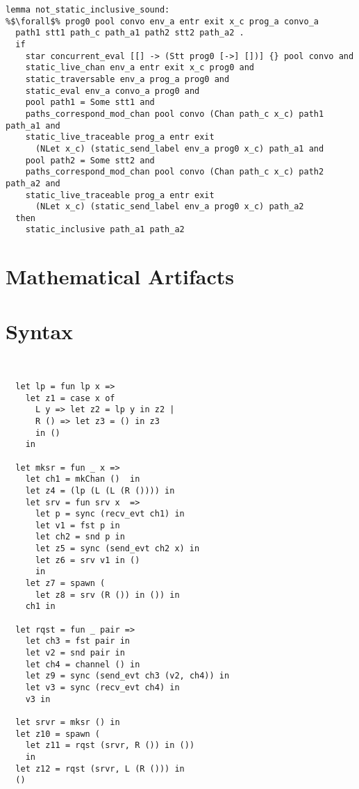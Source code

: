 \documentclass{article}
\begin{document}
\begin{lstlisting}[language=logic, style=codestyle1, escapechar=\%]
lemma not_static_inclusive_sound:
%$\forall$% prog0 pool convo env_a entr exit x_c prog_a convo_a
  path1 stt1 path_c path_a1 path2 stt2 path_a2 .
  if
    star concurrent_eval [[] -> (Stt prog0 [->] [])] {} pool convo and 
    static_live_chan env_a entr exit x_c prog0 and 
    static_traversable env_a prog_a prog0 and 
    static_eval env_a convo_a prog0 and 
    pool path1 = Some stt1 and 
    paths_correspond_mod_chan pool convo (Chan path_c x_c) path1 path_a1 and 
    static_live_traceable prog_a entr exit
      (NLet x_c) (static_send_label env_a prog0 x_c) path_a1 and 
    pool path2 = Some stt2 and 
    paths_correspond_mod_chan pool convo (Chan path_c x_c) path2 path_a2 and 
    static_live_traceable prog_a entr exit
      (NLet x_c) (static_send_label env_a prog0 x_c) path_a2
  then
    static_inclusive path_a1 path_a2

  \end{lstlisting}












\section{Mathematical Artifacts}


\section{Syntax}

\begin{lstlisting}[language=logic, style=codestyle1, escapechar=\%]


  let lp = fun lp x => 
    let z1 = case x of 
      L y => let z2 = lp y in z2 |
      R () => let z3 = () in z3
      in ()
    in

  let mksr = fun _ x => 
    let ch1 = mkChan ()  in
    let z4 = (lp (L (L (R ()))) in
    let srv = fun srv x  =>
      let p = sync (recv_evt ch1) in
      let v1 = fst p in
      let ch2 = snd p in 
      let z5 = sync (send_evt ch2 x) in
      let z6 = srv v1 in ()
      in
    let z7 = spawn (
      let z8 = srv (R ()) in ()) in
    ch1 in

  let rqst = fun _ pair =>
    let ch3 = fst pair in
    let v2 = snd pair in
    let ch4 = channel () in
    let z9 = sync (send_evt ch3 (v2, ch4)) in
    let v3 = sync (recv_evt ch4) in
    v3 in

  let srvr = mksr () in
  let z10 = spawn ( 
    let z11 = rqst (srvr, R ()) in ())
    in
  let z12 = rqst (srvr, L (R ())) in
  () 

  \end{lstlisting}
\end{document}
